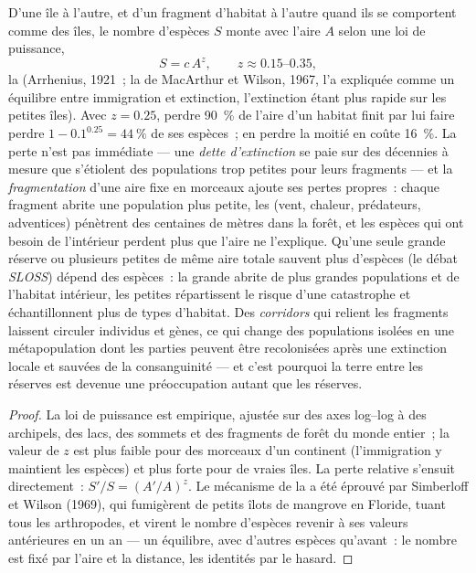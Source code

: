 \begin{proposition}\label{prop:b3:conservation-biology:area}
D'une île à l'autre, et d'un fragment d'habitat à l'autre quand ils se
comportent comme des îles, le nombre d'espèces $S$ monte avec l'aire $A$
selon une loi de puissance,
\[
S = c\,A^{z}, \qquad z \approx 0.15\text{--}0.35,
\]
la \emph{} (Arrhenius, 1921~; la  de MacArthur et Wilson, 1967, l'a expliquée comme un équilibre
entre immigration et extinction, l'extinction étant plus rapide sur les
petites îles). Avec $z = 0.25$, perdre \qty{90}{\%} de l'aire d'un
habitat finit par lui faire perdre $1 - 0.1^{0.25} = \qty{44}{\%}$ de
ses espèces~; en perdre la moitié en coûte \qty{16}{\%}. La perte n'est
pas immédiate --- une \emph{dette d'extinction} se paie sur des
décennies à mesure que s'étiolent des populations trop petites pour
leurs fragments --- et la \emph{fragmentation} d'une aire fixe en
morceaux ajoute ses pertes propres~: chaque fragment abrite une
population plus petite, les \emph{} (vent, chaleur,
prédateurs, adventices) pénètrent des centaines de mètres dans la
forêt, et les espèces qui ont besoin de l'intérieur perdent plus que
l'aire ne l'explique. Qu'une seule grande réserve ou plusieurs petites
de même aire totale sauvent plus d'espèces (le débat \emph{SLOSS})
dépend des espèces~: la grande abrite de plus grandes populations et de
l'habitat intérieur, les petites répartissent le risque d'une
catastrophe et échantillonnent plus de types d'habitat. Des
\emph{corridors} qui relient les fragments laissent circuler individus
et gènes, ce qui change des populations isolées en une métapopulation
dont les parties peuvent être recolonisées après une extinction locale
et sauvées de la consanguinité --- et c'est pourquoi la terre entre les
réserves est devenue une préoccupation autant que les réserves.
\end{proposition}
\begin{proof}
La loi de puissance est empirique, ajustée sur des axes log--log à des
archipels, des lacs, des sommets et des fragments de forêt du monde
entier~; la valeur de $z$ est plus faible pour des morceaux d'un
continent (l'immigration y maintient les espèces) et plus forte pour de
vraies îles. La perte relative s'ensuit directement~:
$S'/S = (A'/A)^{z}$. Le mécanisme de la  a été
éprouvé par Simberloff et Wilson (1969), qui fumigèrent de petits îlots
de mangrove en Floride, tuant tous les arthropodes, et virent le nombre
d'espèces revenir à ses valeurs antérieures en un an --- un équilibre,
avec d'autres espèces qu'avant~: le nombre est fixé par l'aire et la
distance, les identités par le hasard.
\end{proof}

